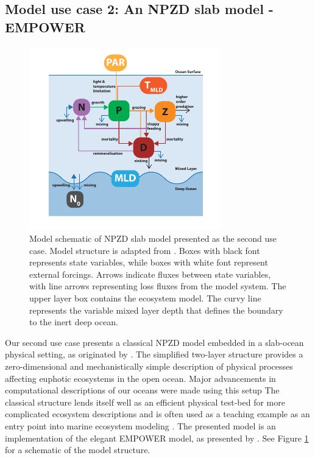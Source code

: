 \documentclass[journal abbreviation, manuscript]{copernicus}
\begin{document}
\subsection{Model use case 2: An NPZD slab model - EMPOWER}
\begin{figure}[t]
\includegraphics[width=8.3cm]{Figures/firstdraft_schematics/02_schematics_EMPOWER.pdf}
\caption{Model schematic of NPZD slab model presented as the second use case. Model structure is adapted
from \citet{Anderson2015c}. Boxes with black font represents state variables, while boxes with white font represent external forcings. Arrows indicate fluxes between state variables, with line arrows representing loss fluxes from the model system. The upper layer box contains the ecosystem model. The curvy line represents the variable mixed layer depth that defines the boundary to the inert deep ocean.}
\label{Figure:ModelSchematics_2}
\end{figure}

Our second use case presents a classical NPZD model embedded in a slab-ocean physical setting, as originated by \citet{Steele1962EnvironmentalSea}. The simplified two-layer structure provides a zero-dimensional and mechanistically simple description of physical processes affecting euphotic ecosystems in the open ocean. Major advancements in computational descriptions of our oceans were made using this setup \citep[e.g.,][]{Evans1985ACycles, Fasham1990a} The classical structure lends itself well as an efficient physical test-bed for more complicated ecosystem descriptions and is often used as a teaching example as an entry point into marine ecosystem modeling \citep{Anderson2015c}.
The presented model is an implementation of the elegant EMPOWER model, as presented by \citet{Anderson2015c}. See Figure \ref{Figure:ModelSchematics_2} for a schematic of the model structure.
\end{document}
